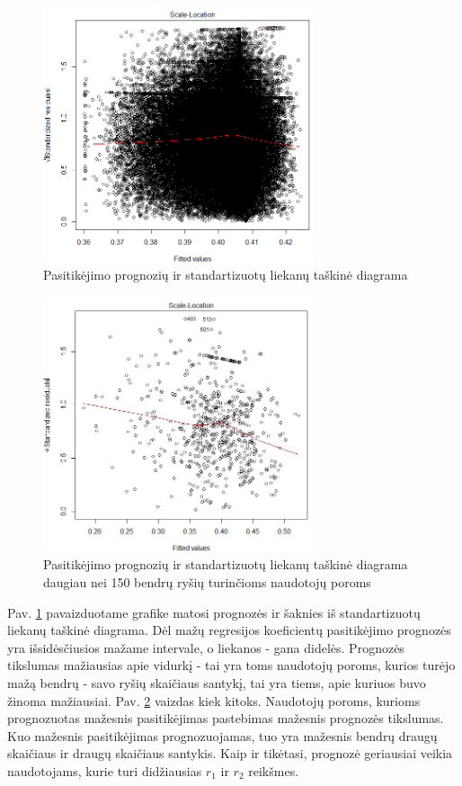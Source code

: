 \documentclass{VUMIFInfMagistrinis}
\begin{document}
\begin{figure}[ht!]
	\centering
	\includegraphics[width=80mm]{CN_residuals.png}
	\caption{Pasitikėjimo prognozių ir standartizuotų liekanų taškinė diagrama} \label{CN_residuals}
\end{figure}
\begin{figure}[ht!]
	\centering
	\includegraphics[width=80mm]{CN_residuals_150.jpg}
	\caption{Pasitikėjimo prognozių ir standartizuotų liekanų taškinė diagrama daugiau nei 150 bendrų ryšių turinčioms naudotojų poroms} \label{CN_residuals_150}
\end{figure}
Pav. \ref{CN_residuals} pavaizduotame grafike matosi prognozės ir šaknies iš standartizuotų liekanų taškinė diagrama. Dėl mažų regresijos koeficientų pasitikėjimo prognozės yra išsidėsčiusios mažame intervale, o liekanos - gana didelės. Prognozės tikslumas mažiausias apie vidurkį - tai yra toms naudotojų poroms, kurios turėjo mažą bendrų - savo ryšių skaičiaus santykį, tai yra tiems, apie kuriuos buvo žinoma mažiausiai. Pav. \ref{CN_residuals_150} vaizdas kiek kitoks. Naudotojų poroms, kurioms prognozuotas mažesnis pasitikėjimas pastebimas mažesnis prognozės tikslumas. Kuo mažesnis pasitikėjimas prognozuojamas, tuo yra mažesnis bendrų draugų skaičiaus ir draugų skaičiaus santykis. Kaip ir tikėtasi, prognozė geriausiai veikia naudotojams, kurie turi didžiausias $r_1$ ir $r_2$ reikšmes.
\end{document}
